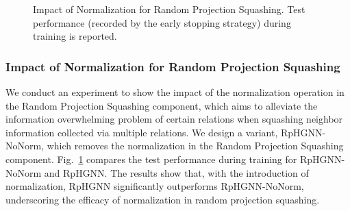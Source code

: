 \documentclass[lettersize,journal]{IEEEtran}
\begin{document}
\begin{table}[!tp]
\centering
\caption{
Impact of Different Random Projection Strategies.
In Sparse Random Projection ($p^{sp}$), $p^{sp}$, as defined by Equation~\ref{eq:rand_proj_squash}, denotes the sparsity of the random projection weight matrix, and larger $p^{sp}$ indicates a more sparse random projection weight matrix.
}
\label{tab:impact_random_proj_strategy}
\end{table}




\begin{figure}[!tp]
\centering
{}
\caption{
Impact of Normalization for Random Projection Squashing.
Test performance (recorded by the early stopping strategy) during training is reported.
}
\label{fig:impact_norm} \end{figure}









\subsubsection{Impact of Normalization for Random Projection Squashing}

We conduct an experiment to show the impact of the normalization operation in the Random Projection Squashing component, which aims to alleviate the information overwhelming problem of certain relations when squashing neighbor information collected via multiple relations.
We design a variant, RpHGNN-NoNorm, which removes the normalization in the Random Projection Squashing component.
Fig.~\ref{fig:impact_norm} compares the test performance during training for RpHGNN-NoNorm and RpHGNN.
The results show that, with the introduction of normalization, RpHGNN significantly outperforms RpHGNN-NoNorm, underscoring the efficacy of normalization in random projection squashing.
\end{document}
